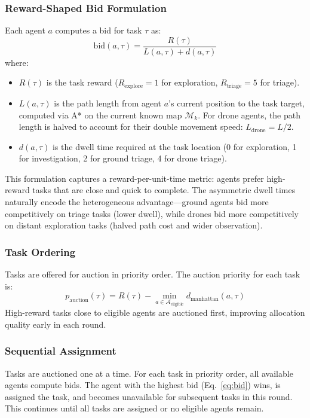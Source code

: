 \documentclass[conference]{IEEEtran}
\begin{document}
\subsubsection{Reward-Shaped Bid Formulation}
Each agent $a$ computes a bid for task $\tau$ as:
\begin{equation}
    \text{bid}(a, \tau) = \frac{R(\tau)}{L(a, \tau) + d(a, \tau)}
    \label{eq:bid}
\end{equation}
where:
\begin{itemize}
    \item $R(\tau)$ is the task reward ($R_{\text{explore}} = 1$ for exploration, $R_{\text{triage}} = 5$ for triage).
    \item $L(a, \tau)$ is the path length from agent $a$'s current position to the task target, computed via A* on the current known map $\mathcal{M}_k$. For drone agents, the path length is halved to account for their double movement speed: $L_{\text{drone}} = L / 2$.
    \item $d(a, \tau)$ is the dwell time required at the task location (0 for exploration, 1 for investigation, 2 for ground triage, 4 for drone triage).
\end{itemize}

This formulation captures a reward-per-unit-time metric: agents prefer high-reward tasks that are close and quick to complete. The asymmetric dwell times naturally encode the heterogeneous advantage---ground agents bid more competitively on triage tasks (lower dwell), while drones bid more competitively on distant exploration tasks (halved path cost and wider observation).

\subsubsection{Task Ordering}
Tasks are offered for auction in priority order. The auction priority for each task is:
\begin{equation}
    p_{\text{auction}}(\tau) = R(\tau) - \min_{a \in \mathcal{A}_{\text{eligible}}} d_{\text{manhattan}}(a, \tau)
\end{equation}
High-reward tasks close to eligible agents are auctioned first, improving allocation quality early in each round.

\subsubsection{Sequential Assignment}
Tasks are auctioned one at a time. For each task in priority order, all available agents compute bids. The agent with the highest bid (Eq.~\ref{eq:bid}) wins, is assigned the task, and becomes unavailable for subsequent tasks in this round. This continues until all tasks are assigned or no eligible agents remain.
\end{document}
